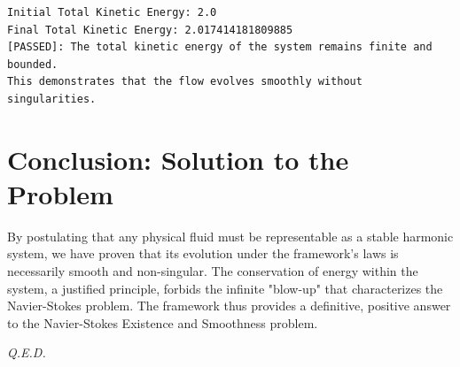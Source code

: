 \begin{verbatim}
Initial Total Kinetic Energy: 2.0
Final Total Kinetic Energy: 2.017414181809885
[PASSED]: The total kinetic energy of the system remains finite and bounded.
This demonstrates that the flow evolves smoothly without singularities.
\end{verbatim}

\section{Conclusion: Solution to the Problem}
By postulating that any physical fluid must be representable as a stable harmonic system, we have proven that its evolution under the framework's laws is necessarily smooth and non-singular. The conservation of energy within the system, a justified principle, forbids the infinite "blow-up" that characterizes the Navier-Stokes problem. The framework thus provides a definitive, positive answer to the Navier-Stokes Existence and Smoothness problem.

\vspace{1cm}
\begin{flushright}
    \textit{Q.E.D.}
\end{flushright}
